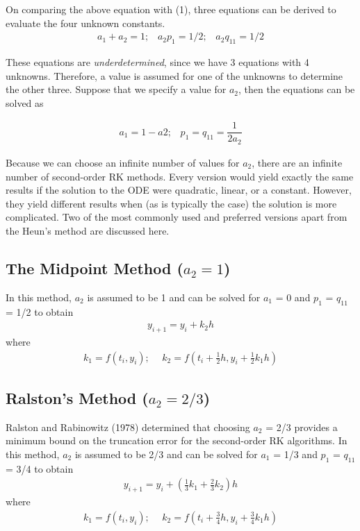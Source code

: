 \documentclass[book.tex]{subfiles}
\begin{document}
 On comparing the above equation with (1), three equations can be derived to evaluate the four unknown constants.
\begin{align}
a_1 + a_2 = 1 ; \hspace{10pt}a_2p_1 = 1/2; \hspace{10pt} a_2q_{11} = 1/2
\end{align}

These equations are \textit{underdetermined}, since we have 3 equations with 4 unknowns. Therefore, a value is assumed for one of the unknowns to determine the other three. Suppose that we specify a value for $a_2$, then the equations can be solved as

\begin{align}
		a_1 = 1 - a2; \hspace{10pt} p_1 = q_{11} = \dfrac{1}{2a_2}
\end{align}
 
Because we can choose an infinite number of values for $a_2$, there are an infinite number of second-order RK methods. Every version would yield exactly the same results if the solution to the ODE were quadratic, linear, or a constant. However, they yield different results when (as is typically the case) the solution is more complicated. Two of the most commonly used and preferred versions apart from the Heun's method are discussed here.

\subsection{The Midpoint Method ($a_2 = 1$)}
In this method, $a_2$ is assumed to be 1 and can be solved for $a_1$ = 0 and $p_1$ = $q_{11}$ = 1/2 to obtain
\begin{align}
y_{i+1} = y_{i} + k_2h
\end{align}
where
\begin{align}
k_1 = f(t_i,y_i); \hspace{15pt}k_2 = f(t_i + \frac{1}{2}h,y_i + \frac{1}{2}k_1h)	
\end{align}

\subsection{Ralston's Method ($a_2 = 2/3$)}
Ralston and Rabinowitz (1978) determined that choosing $a_2$ = 2/3 provides a minimum bound on the truncation error for the second-order RK algorithms. In this method, $a_2$ is assumed to be 2/3 and can be solved for $a_1$ = 1/3 and $p_1$ = $q_{11}$ = 3/4 to obtain
\begin{align}
y_{i+1} = y_{i} + (\frac{1}{3}k_1 + \frac{2}{3}k_2)h
\end{align}
where
\begin{align}
k_1 = f(t_i,y_i);\hspace{15pt}	k_2 = f(t_i + \frac{3}{4}h,y_i + \frac{3}{4}k_1h)	
\end{align}
\end{document}
